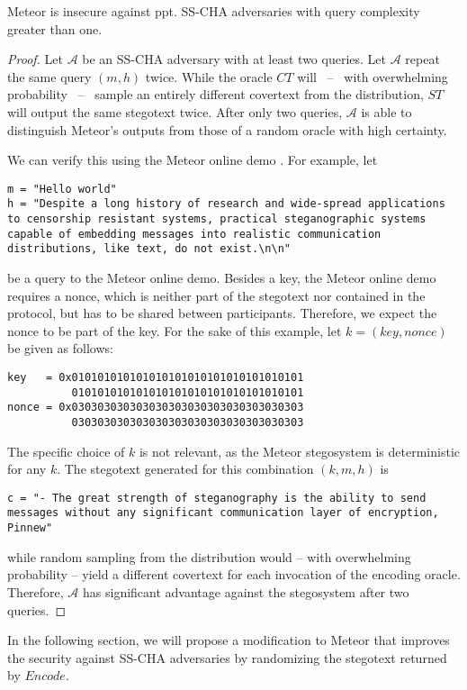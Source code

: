 \begin{theorem}
  Meteor is insecure against ppt. SS-CHA adversaries with query complexity greater than one.
\end{theorem}
\begin{proof}
Let $\mathcal{A}$ be an SS-CHA adversary with at least two queries.
Let $\mathcal{A}$ repeat the same query $(m,h)$ twice.
While the oracle $CT$ will~ --~ with overwhelming probability~ --~ sample an entirely different covertext from the distribution,  $ST$ will output the same stegotext twice.
After only two queries, $\mathcal{A}$ is able to distinguish Meteor's outputs from those of a random oracle with high certainty.

We can verify this using the Meteor online demo \cite{MeteorDemo2021}.
For example, let
\begin{lstlisting}
m = "Hello world"
h = "Despite a long history of research and wide-spread applications to censorship resistant systems, practical steganographic systems capable of embedding messages into realistic communication distributions, like text, do not exist.\n\n"
\end{lstlisting}
be a query to the Meteor online demo.
Besides a key, the Meteor online demo requires a nonce, which is neither part of the stegotext nor contained in the protocol, but has to be shared between participants.
Therefore, we expect the nonce to be part of the key.
For the sake of this example, let $k = (key, nonce)$ be given as follows:
\begin{lstlisting}
key   = 0x010101010101010101010101010101010101
          010101010101010101010101010101010101
nonce = 0x030303030303030303030303030303030303
          030303030303030303030303030303030303
\end{lstlisting}
The specific choice of $k$ is not relevant, as the Meteor stegosystem is deterministic for any $k$.
The stegotext generated for this combination $(k,m,h)$ is
\begin{lstlisting}
c = "- The great strength of steganography is the ability to send messages without any significant communication layer of encryption, Pinnew"
\end{lstlisting}
while random sampling from the distribution would -- with overwhelming probability -- yield a different covertext for each invocation of the encoding oracle.
Therefore, $\mathcal{A}$ has significant advantage against the stegosystem after two queries.
\end{proof}

In the following section, we will propose a modification to Meteor that improves the security against SS-CHA adversaries by randomizing the stegotext returned by $Encode$.


